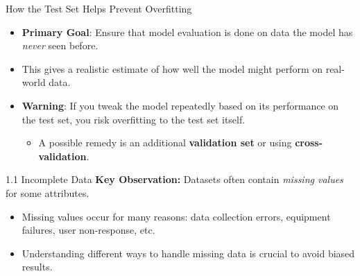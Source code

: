 \begin{frame}{How the Test Set Helps Prevent Overfitting}
\begin{itemize}
    \item \textbf{Primary Goal}: Ensure that model evaluation is done on data the model has \textit{never} seen before.
    \item This gives a realistic estimate of how well the model might perform on real-world data.
    \item \textbf{Warning}: If you tweak the model repeatedly based on its performance on the test set, you risk overfitting to the test set itself. 
    \begin{itemize}
      \item A possible remedy is an additional \textbf{validation set} or using \textbf{cross-validation}.
    \end{itemize}
\end{itemize}
\end{frame}

\begin{frame}{1.1 Incomplete Data}
\textbf{Key Observation:} Datasets often contain \emph{missing values} for some attributes.

\begin{itemize}
  \item Missing values occur for many reasons: data collection errors, equipment failures, 
        user non-response, etc.
  \item Understanding different ways to handle missing data is crucial to avoid biased results.
\end{itemize}

\end{frame}

